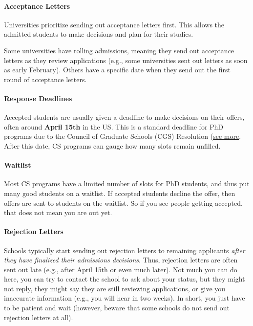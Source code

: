 \documentclass[oneside,11pt,dvipsnames]{book}
\begin{document}

\paragraph{Acceptance Letters} Universities prioritize sending out acceptance letters first. This allows the admitted students to make decisions and plan for their studies.

Some universities have rolling admissions, meaning they send out acceptance letters as they review applications (e.g., some universities sent out letters as soon as early February). Others have a specific date when they send out the first round of acceptance letters.   

\paragraph{Response Deadlines} Accepted students are usually given a deadline to make decisions on their offers, often around \textbf{April 15th} in the US. This is a standard deadline for PhD programs due to the Council of Graduate Schools (CGS) Resolution (\href{https://cgsnet.org/wp-content/uploads/2024/01/CGS_April15_Resolution_Jan312024.pdf}{see more}. After this date, CS programs can gauge how many slots remain unfilled.

\paragraph{Waitlist} Most CS programs have a limited number of slots for PhD students, and thus put many good students on a waitlist.  If accepted students decline the offer, then offers are sent to students on the waitlist. So if you see people getting accepted, that does not mean you are out yet.

\paragraph{Rejection Letters} Schools typically start sending out rejection letters to remaining applicants \emph{after they have finalized their admissions decisions}. Thus, rejection letters are often sent out late (e.g., after April 15th or even much later). Not much you can do here, you can try to contact the school to ask about your status, but they might not reply, they might say they are still reviewing applications, or give you inaccurate information (e.g., you will hear in two weeks). In short, you just have to be patient and wait (however, beware that some schools do not send out rejection letters at all).
\end{document}
